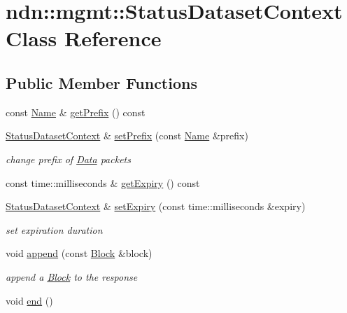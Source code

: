 \hypertarget{classndn_1_1mgmt_1_1StatusDatasetContext}{}\section{ndn\+:\+:mgmt\+:\+:Status\+Dataset\+Context Class Reference}
\label{classndn_1_1mgmt_1_1StatusDatasetContext}
\subsection*{Public Member Functions}
\begin{DoxyCompactItemize}
\item 
const \hyperlink{classndn_1_1Name}{Name} \& \hyperlink{classndn_1_1mgmt_1_1StatusDatasetContext_aac0fae9a1143700aeacfd274c109c2c5}{get\+Prefix} () const
\item 
\hyperlink{classndn_1_1mgmt_1_1StatusDatasetContext}{Status\+Dataset\+Context} \& \hyperlink{classndn_1_1mgmt_1_1StatusDatasetContext_a154cd0e7ac0b24f36a5b9f9e43952216}{set\+Prefix} (const \hyperlink{classndn_1_1Name}{Name} \&prefix)
\begin{DoxyCompactList}\small\item\em change prefix of \hyperlink{classndn_1_1Data}{Data} packets \end{DoxyCompactList}\item 
const time\+::milliseconds \& \hyperlink{classndn_1_1mgmt_1_1StatusDatasetContext_a53458cb0a29da60ff289616629c59e83}{get\+Expiry} () const
\item 
\hyperlink{classndn_1_1mgmt_1_1StatusDatasetContext}{Status\+Dataset\+Context} \& \hyperlink{classndn_1_1mgmt_1_1StatusDatasetContext_a361ac45e2c56f83666bcdbc0fb33d91a}{set\+Expiry} (const time\+::milliseconds \&expiry)
\begin{DoxyCompactList}\small\item\em set expiration duration \end{DoxyCompactList}\item 
void \hyperlink{classndn_1_1mgmt_1_1StatusDatasetContext_a13909ee98cd5e4844a5c7abd3ceb1cfb}{append} (const \hyperlink{classndn_1_1Block}{Block} \&block)
\begin{DoxyCompactList}\small\item\em append a \hyperlink{classndn_1_1Block}{Block} to the response \end{DoxyCompactList}\item 
void \hyperlink{classndn_1_1mgmt_1_1StatusDatasetContext_a89a039b8984b5afc43849f19b170a61f}{end} ()

\end{DoxyCompactItemize}
